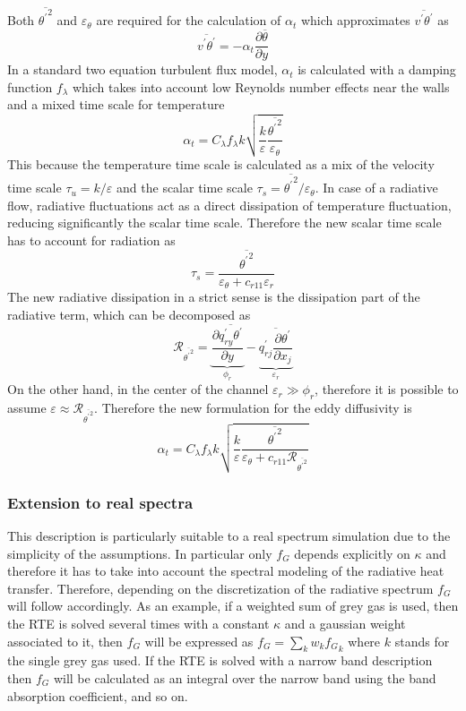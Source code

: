 \documentclass[10pt]{article}
\def\tp{\overline{{\theta^\prime}^2}}
\def\tm{\overline{\theta}}
\def\tr{{\theta^\prime}}
\def\et{{\varepsilon_{\theta}}}
\begin{document}
\noindent Both $\tp$ and $\et$ are required for the calculation of $\alpha_t$ which approximates $\overline{v^\prime \tr}$ as
\begin{equation*}
\overline{v^\prime \tr} = - \alpha_t \frac{\partial \tm}{\partial y}
\end{equation*}
In a standard two equation turbulent flux model, $\alpha_t$ is calculated with a damping function $f_{\lambda}$ which takes into account low Reynolds number effects near the walls and a mixed time scale for temperature
\begin{equation*}
\alpha_t = C_{\lambda} f_{\lambda} k \sqrt{\frac{k}{\varepsilon}\frac{\tp}{\et}}
\end{equation*} 
This because the temperature time scale is calculated as a mix of the velocity time scale $\tau_u= k/\varepsilon$ and the scalar time scale $\tau_s = \tp/\et$. In case of a radiative flow, radiative fluctuations act as a direct dissipation of temperature fluctuation, reducing significantly the scalar time scale. Therefore the new scalar time scale has to account for radiation as
\begin{equation*}
\tau_s = \frac{\tp}{\et +c_{r11} \varepsilon_r}
\end{equation*}
The new radiative dissipation in a strict sense is the dissipation part of the radiative term, which can be decomposed as
\begin{equation*}
\mathcal{R}_{\tp} =  \underbrace{\frac{\partial \overline{q_{ry}^\prime \tr}}{\partial y}}_{\phi_r} - \underbrace{\overline{q_{rj}^\prime\frac{\partial \tr}{\partial x_j}}}_{\varepsilon_r} 
\end{equation*}
On the other hand, in the center of the channel $\varepsilon_r \gg \phi_r$, therefore it is possible to assume $\varepsilon \approx \mathcal{R}_{\tp}$.
Therefore the new formulation for the eddy diffusivity is
\begin{equation*}
\alpha_t = C_{\lambda} f_{\lambda} k \sqrt{\frac{k}{\varepsilon}\frac{\tp}{\et+c_{r11} \mathcal{R}_{\tp}}}
\end{equation*}

\subsubsection*{Extension to real spectra}
This description is particularly suitable to a real spectrum simulation due to the simplicity of the assumptions. In particular only $f_{G}$ depends explicitly on $\kappa$ and therefore it has to take into account the spectral modeling of the radiative heat transfer. Therefore, depending on the discretization of the radiative spectrum $f_{G}$ will follow accordingly. As an example, if a weighted sum of grey gas is used, then the RTE is solved several times with a constant $\kappa$ and a gaussian weight associated to it, then $f_G$ will be expressed as $f_G = \sum_k w_k {f_G}_k$ where $k$ stands for the single grey gas used. If the RTE is solved with a narrow band description then $f_G$ will be calculated as an integral over the narrow band using the band absorption coefficient, and so on.
\end{document}
